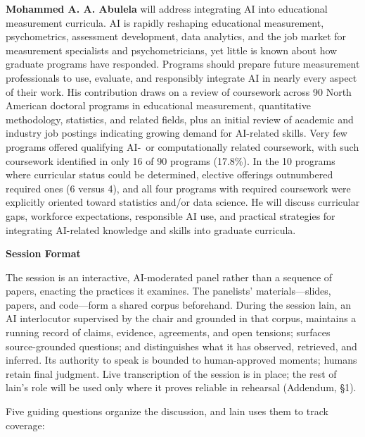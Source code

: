 \documentclass[11pt]{article}
\newcommand{\fieldlabel}[2][]{%
  \par\addvspace{1.25em}\Needspace{8\baselineskip}%
  \noindent\begin{minipage}{\linewidth}%
    {\NotoHeading\bfseries\large\color{ContentPrimary}#2}%
    \hfill{\normalfont\footnotesize\color{ContentSecondary}#1}%
  \end{minipage}\par
  \vspace{0.2em}{\color{BorderModerate}\rule{\linewidth}{0.4pt}}\par
  \vspace{0.55em}%
}
\begin{document}
\textbf{Mohammed A. A. Abulela} will address integrating AI into educational
measurement curricula. AI is rapidly reshaping educational measurement,
psychometrics, assessment development, data analytics, and the job market for
measurement specialists and psychometricians, yet little is known about how
graduate programs have responded. Programs should prepare future measurement
professionals to use, evaluate, and responsibly integrate AI in nearly every
aspect of their work. His contribution draws on a review of coursework across 90
North American doctoral programs in educational measurement, quantitative
methodology, statistics, and related fields, plus an initial review of academic
and industry job postings indicating growing demand for AI-related skills. Very
few programs offered qualifying \mbox{AI- or} computationally related coursework, with
such coursework identified in only 16 of 90 programs (17.8\%). In the 10
programs where curricular status could be determined, elective offerings
outnumbered required ones (6 versus 4), and all four programs with required
coursework were explicitly oriented toward statistics and/or data science. He will discuss
curricular gaps, workforce expectations, responsible AI use, and practical
strategies for integrating AI-related knowledge and skills into graduate
curricula.

\fieldlabel{Session Format}

The session is an interactive, AI-moderated panel rather than a sequence of
papers, enacting the practices it examines. The panelists' materials---slides,
papers, and code---form a shared corpus beforehand. During the
session lain, an AI interlocutor supervised by the chair and grounded in that
corpus,
maintains a running record of claims, evidence, agreements, and open tensions;
surfaces source-grounded questions; and distinguishes what it has observed,
retrieved, and inferred. Its authority to speak is bounded to human-approved
moments; humans retain final judgment. Live transcription of the session is in
place; the rest of lain's role will be used only where it proves reliable in
rehearsal (Addendum, \S1).

Five guiding questions organize the discussion, and lain uses them to track
coverage:
\end{document}
